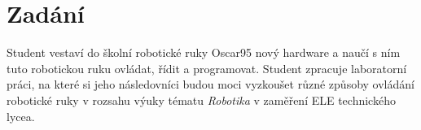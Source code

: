 \newpage
\section*{Zadání}

Student vestaví do školní robotické ruky Oscar95 nový hardware a naučí s ním tuto robotickou ruku ovládat, řídit a programovat. Student zpracuje laboratorní práci, na které si jeho následovníci budou moci vyzkoušet různé způsoby ovládání robotické ruky v rozsahu výuky tématu \textit{Robotika} v zaměření ELE technického lycea.